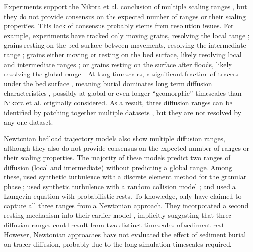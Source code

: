 Experiments support the Nikora et al. conclusion of multiple scaling ranges \citep{Martin2012,Fathel2016}, but they do not provide consensus on the expected number of ranges or their scaling properties.
This lack of consensus probably stems from resolution issues.
For example, experiments have tracked only moving grains, resolving the local range \citep{Furbish2012,Furbish2017,Fathel2016}; grains resting on the bed surface between movements, resolving the intermediate range \citep{Einstein1937,Yano1969,Nakagawa1976}; grains either moving or resting on the bed surface, likely resolving local and intermediate ranges \citep{Martin2012}; or grains resting on the surface after floods, likely resolving the global range \citep{Phillips2013,Bradley2017}. 
At long timescales, a significant fraction of tracers \DIFdelbegin {}\DIFdelend \DIFaddbegin {}\DIFaddend under the bed surface \citep{Hassan1991,Hassan2013,Ferguson2002a,Haschenburger2013,Papangelakis2016}, meaning burial dominates long term diffusion characteristics \citep{Bradley2017,Martin2014,Voepel2013}, possibly at global or even longer ``geomorphic'' timescales \citep{Hassan2017} than Nikora et al. originally considered.
As a result, three diffusion ranges can be identified by patching together multiple datasets \citep{Zhang2012,Nikora2002}, but they are not resolved by any one dataset.

Newtonian bedload trajectory models also show multiple diffusion ranges, although they also do not provide consensus on the expected number of ranges or their scaling properties. 
The majority of these models predict two ranges of diffusion (local and intermediate) without predicting a global range.
Among these, \citet{Nikora2001a} used synthetic turbulence \citep{Kraichnan1970} with a discrete element method for the granular phase \DIFdelbegin {}\DIFdelend \DIFaddbegin {}\DIFaddend ; \citet{Bialik2012} used synthetic turbulence with a random collision model \citep{Sekine1992}; and \citet{Fan2016} used a Langevin equation with probabilistic rests.
To \DIFdelbegin {}\DIFdelend \DIFaddbegin {}\DIFaddend knowledge, only \citet{Bialik2015} have claimed to capture all three ranges from a Newtonian approach.
They incorporated a second resting mechanism into their earlier model \citep{Bialik2012}, implicitly suggesting that three diffusion ranges could result from two distinct timescales of sediment rest.
However, Newtonian approaches have not evaluated the effect of sediment burial on tracer diffusion, probably due to the long simulation timescales required. 

